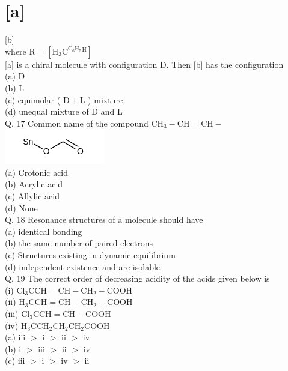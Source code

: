 \documentclass[10pt]{article}
\begin{document}
\section*{[a]}
[b]\\
where $\mathrm{R}=\left[\mathrm{H}_{3} \mathrm{C}^{\mathrm{C}_{6} \mathrm{H}_{5}}{ }^{\mathrm{H}}\right]$\\[0pt]
[a] is a chiral molecule with configuration D. Then [b] has the configuration\\
(a) D\\
(b) L\\
(c) equimolar ( $\mathrm{D}+\mathrm{L}$ ) mixture\\
(d) unequal mixture of D and L\\
Q. 17 Common name of the compound $\mathrm{CH}_{3}-\mathrm{CH}=\mathrm{CH}-$\\
\includegraphics{smile-0d318579ca30fd3ac7165f1cf6bff9bd179599ac}\\
(a) Crotonic acid\\
(b) Acrylic acid\\
(c) Allylic acid\\
(d) None\\
Q. 18 Resonance structures of a molecule should have\\
(a) identical bonding\\
(b) the same number of paired electrons\\
(c) Structures existing in dynamic equilibrium\\
(d) independent existence and are isolable\\
Q. 19 The correct order of decreasing acidity of the acids given below is\\
(i) $\mathrm{Cl}_{3} \mathrm{CCH}=\mathrm{CH}-\mathrm{CH}_{2}-\mathrm{COOH}$\\
(ii) $\mathrm{H}_{3} \mathrm{CCH}=\mathrm{CH}-\mathrm{CH}_{2}-\mathrm{COOH}$\\
(iii) $\mathrm{Cl}_{3} \mathrm{CCH}=\mathrm{CH}-\mathrm{COOH}$\\
(iv) $\mathrm{H}_{3} \mathrm{CCH}_{2} \mathrm{CH}_{2} \mathrm{CH}_{2} \mathrm{COOH}$\\
(a) iii $>$ i $>$ ii $>$ iv\\
(b) i $>$ iii $>$ ii $>$ iv\\
(c) iii $>$ i $>$ iv $>$ ii\\
\end{document}
